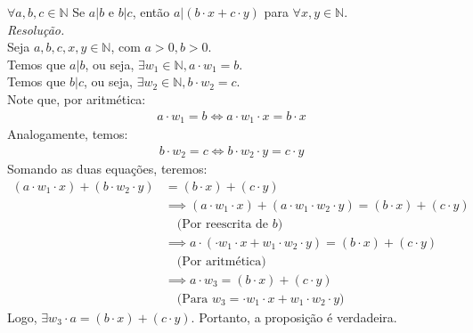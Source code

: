$\forall a, b, c \in \mathbb{N}$ Se $a | b$ e $b | c$, então $a | (b \cdot x + c \cdot y)$ para $\forall x, y \in \mathbb{N}$. \\
\emph{Resolução.} \\
Seja $a, b, c, x, y \in \mathbb{N}$, com $a > 0, b > 0$. \\
Temos que $a | b$, ou seja, $\exists w_1 \in \mathbb{N}, a \cdot w_1 = b$. \\
Temos que $b | c$, ou seja, $\exists w_2 \in \mathbb{N}, b \cdot w_2 = c$. \\
Note que, por aritmética:
\begin{align*}
    a \cdot w_1 = b \iff a \cdot w_1 \cdot x = b \cdot x
\end{align*}
Analogamente, temos:
\begin{align*}
    b \cdot w_2 = c \iff b \cdot w_2 \cdot y = c \cdot y
\end{align*}
Somando as duas equações, teremos:
\begin{align*}
    (a \cdot w_1 \cdot x) + (b \cdot w_2 \cdot y) & = (b \cdot x) + (c \cdot y)         \\ &\implies
    (a \cdot w_1 \cdot x) + (a \cdot w_1 \cdot w_2 \cdot y) = (b \cdot x) + (c \cdot y) \\ &\quad \text{(Por reescrita de $b$)}\\ &\implies
    a \cdot (\cdot w_1 \cdot x + w_1 \cdot w_2 \cdot y) = (b \cdot x) + (c \cdot y)     \\ &\quad \text{(Por aritmética)} \\ &\implies
    a \cdot w_3 = (b \cdot x) + (c \cdot y)                                             \\ &\quad \text{(Para $w_3 = \cdot w_1 \cdot x + w_1 \cdot w_2 \cdot y$)}
\end{align*}
Logo, $\exists w_3 \cdot a = (b \cdot x) + (c \cdot y)$.
Portanto, a proposição é verdadeira.